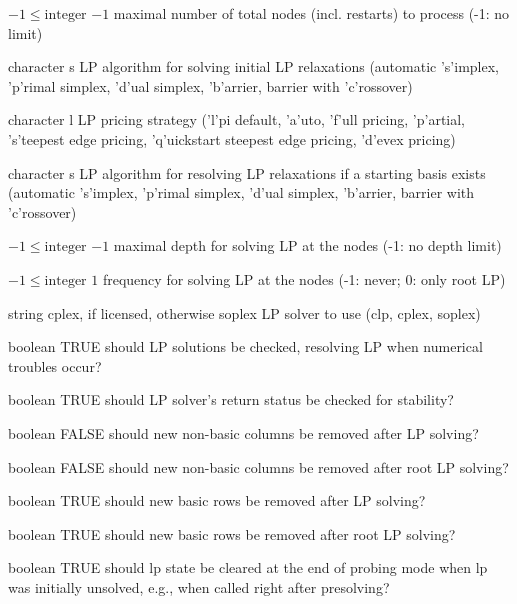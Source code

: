 %
{$-1\leq\textrm{integer}$}%
{$-1$}%
{maximal number of total nodes (incl. restarts) to process (-1: no limit)}%
{}

%
{character}%
{s}%
{LP algorithm for solving initial LP relaxations (automatic 's'implex, 'p'rimal simplex, 'd'ual simplex, 'b'arrier, barrier with 'c'rossover)}%
{}

%
{character}%
{l}%
{LP pricing strategy ('l'pi default, 'a'uto, 'f'ull pricing, 'p'artial, 's'teepest edge pricing, 'q'uickstart steepest edge pricing, 'd'evex pricing)}%
{}

%
{character}%
{s}%
{LP algorithm for resolving LP relaxations if a starting basis exists (automatic 's'implex, 'p'rimal simplex, 'd'ual simplex, 'b'arrier, barrier with 'c'rossover)}%
{}

%
{$-1\leq\textrm{integer}$}%
{$-1$}%
{maximal depth for solving LP at the nodes (-1: no depth limit)}%
{}

%
{$-1\leq\textrm{integer}$}%
{$1$}%
{frequency for solving LP at the nodes (-1: never; 0: only root LP)}%
{}

%
{string}%
{cplex, if licensed, otherwise soplex}%
{LP solver to use (clp, cplex, soplex)}%
{}

%
{boolean}%
{TRUE}%
{should LP solutions be checked, resolving LP when numerical troubles occur?}%
{}

%
{boolean}%
{TRUE}%
{should LP solver's return status be checked for stability?}%
{}

%
{boolean}%
{FALSE}%
{should new non-basic columns be removed after LP solving?}%
{}

%
{boolean}%
{FALSE}%
{should new non-basic columns be removed after root LP solving?}%
{}

%
{boolean}%
{TRUE}%
{should new basic rows be removed after LP solving?}%
{}

%
{boolean}%
{TRUE}%
{should new basic rows be removed after root LP solving?}%
{}

%
{boolean}%
{TRUE}%
{should lp state be cleared at the end of probing mode when lp was initially unsolved, e.g., when called right after presolving?}%
{}

